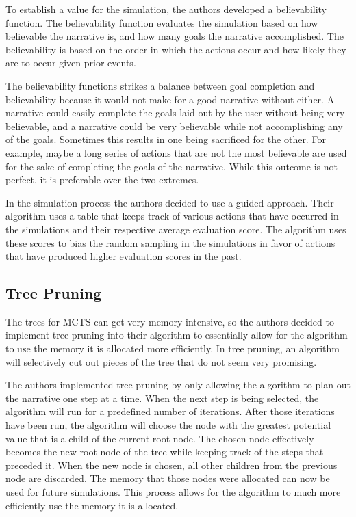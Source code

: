 \documentclass{sig-alternate}
\begin{document}
To establish a value for the simulation, the authors developed a believability function. The believability function evaluates the simulation based on how believable the narrative is, and how many goals the narrative accomplished. The believability is based on the order in which the actions occur and how likely they are to occur given prior events.

The believability functions strikes a balance between goal completion and believability because it would not make for a good narrative without either. A narrative could easily complete the goals laid out by the user without being very believable, and a narrative could be very believable while not accomplishing any of the goals. Sometimes this results in one being sacrificed for the other. For example, maybe a long series of actions that are not the most believable are used for the sake of completing the goals of the narrative. While this outcome is not perfect, it is preferable over the two extremes.

In the simulation process the authors decided to use a guided approach. Their algorithm uses a table that keeps track of various actions that have occurred in the simulations and their respective average evaluation score. The algorithm uses these scores to bias the random sampling in the simulations in favor of actions that have produced higher evaluation scores in the past. 
\subsection{Tree Pruning}
The trees for MCTS can get very memory intensive, so the authors decided to implement tree pruning into their algorithm to essentially allow for the algorithm to use the memory it is allocated more efficiently. In tree pruning, an algorithm will selectively cut out pieces of the tree that do not seem very promising.  

The authors implemented tree pruning by only allowing the algorithm to plan out the narrative one step at a time. When the next step is being selected, the algorithm will run for a predefined number of iterations. After those iterations have been run, the algorithm will choose the node with the greatest potential value that is a child of the current root node. The chosen node effectively becomes the new root node of the tree while keeping track of the steps that preceded it. When the new node is chosen, all other children from the previous node are discarded. The memory that those nodes were allocated can now be used for future simulations. This process allows for the algorithm to much more efficiently use the memory it is allocated.
\end{document}
